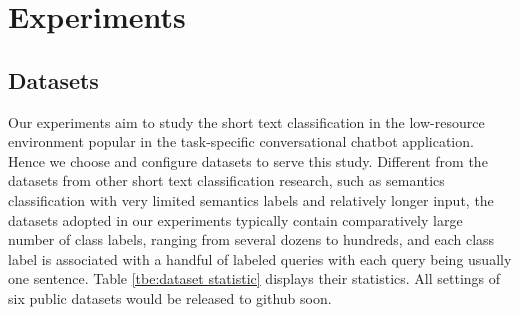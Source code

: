 \section{Experiments}
\label{sec:exp}

\subsection{Datasets}
Our experiments aim to study the short text classification in the low-resource
environment  popular  in  the  task-specific conversational chatbot application.
Hence we choose and configure datasets to serve this study. Different from
the  datasets from other short text classification research, such as semantics
classification  with  very  limited  semantics labels and relatively longer
input,   the   datasets  adopted  in  our  experiments   typically  contain
comparatively  large  number  of  class labels, ranging from several dozens to
hundreds,  and  each  class  label  is  associated  with  a handful of labeled
queries with each  query  being usually  one  sentence. Table \ref{tbe:dataset
statistic} displays their statistics.  All settings of six public datasets would 
be released to github soon.

